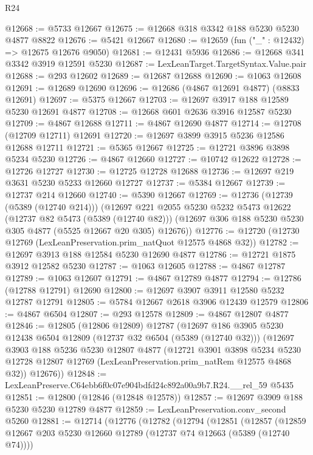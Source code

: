 \begin{lexlean}{R24}
\begin{coremodule}
@12668 := @5733 @12667
@12675 := @12668 @318 @3342 @188 @5230 @5230 @4877 @8822
@12676 := @5421 @12667
@12680 := @12659 (fun ("_" : @12432) => @12675 @12676 @9050)
@12681 := @12431 @5936
@12686 := @12668 @341 @3342 @3919 @12591 @5230
@12687 := LexLeanTarget.TargetSyntax.Value.pair
@12688 := @293 @12602
@12689 := @12687 @12688
@12690 := @1063 @12608
@12691 := @12689 @12690
@12696 := @12686 (@4867 @12691 @4877) (@8833 @12691)
@12697 := @5375 @12667
@12703 := @12697 @3917 @188 @12589 @5230 @12691 @4877
@12708 := @12668 @601 @2636 @3916 @12587 @5230
@12709 := @4867 @12688
@12711 := @4867 @12690 @4877
@12714 := @12708 (@12709 @12711) @12691
@12720 := @12697 @3899 @3915 @5236 @12586 @12688 @12711
@12721 := @5365 @12667
@12725 := @12721 @3896 @3898 @5234 @5230
@12726 := @4867 @12660
@12727 := @10742 @12622
@12728 := @12726 @12727
@12730 := @12725 @12728 @12688
@12736 := @12697 @219 @3631 @5230 @5233 @12660 @12727
@12737 := @5384 @12667
@12739 := @12737 @214 @12660
@12740 := @5390 @12667
@12769 := @12736
    (@12739 (@5389 (@12740 @214)))
    (@12697
      @221
      @2055
      @5230
      @5232
      @5473
      @12622
      (@12737 @82 @5473 (@5389 (@12740 @82)))
      (@12697 @306 @188 @5230 @5230 @305 @4877 (@5525 @12667 @20 @305) @12676))
@12776 := @12720 (@12730 @12769 (LexLeanPreservation.prim_natQuot @12575 @4868 @32))
@12782 := @12697 @3913 @188 @12584 @5230 @12690 @4877
@12786 := @12721 @1875 @3912 @12582 @5230
@12787 := @1063 @12605
@12788 := @4867 @12787
@12789 := @1063 @12607
@12791 := @4867 @12789 @4877
@12794 := @12786 (@12788 @12791) @12690
@12800 := @12697 @3907 @3911 @12580 @5232 @12787 @12791
@12805 := @5784 @12667 @2618 @3906 @12439 @12579
@12806 := @4867 @6504
@12807 := @293 @12578
@12809 := @4867 @12807 @4877
@12846 := @12805
    (@12806 @12809)
    @12787
    (@12697
      @186
      @3905
      @5230
      @12438
      @6504
      @12809
      (@12737 @32 @6504 (@5389 (@12740 @32)))
      (@12697
        @3903
        @188
        @5236
        @5230
        @12807
        @4877
        (@12721
          @3901
          @3898
          @5234
          @5230
          @12728
          @12807
          @12769
          (LexLeanPreservation.prim_natRem @12575 @4868 @32))
        @12676))
@12848 := LexLeanPreserve.C64ebb6f0c07e904bdfd24c892a00a9b7.R24.__rel_59 @5435
@12851 := @12800 (@12846 (@12848 @12578))
@12857 := @12697 @3909 @188 @5230 @5230 @12789 @4877
@12859 := LexLeanPreservation.conv_second @5260
@12881 := @12714
    (@12776
      (@12782
        (@12794
          (@12851
            (@12857
              (@12859 @12667 @203 @5230 @12660 @12789 (@12737 @74 @12663 (@5389 (@12740 @74))))

\end{coremodule}
\end{lexlean}
